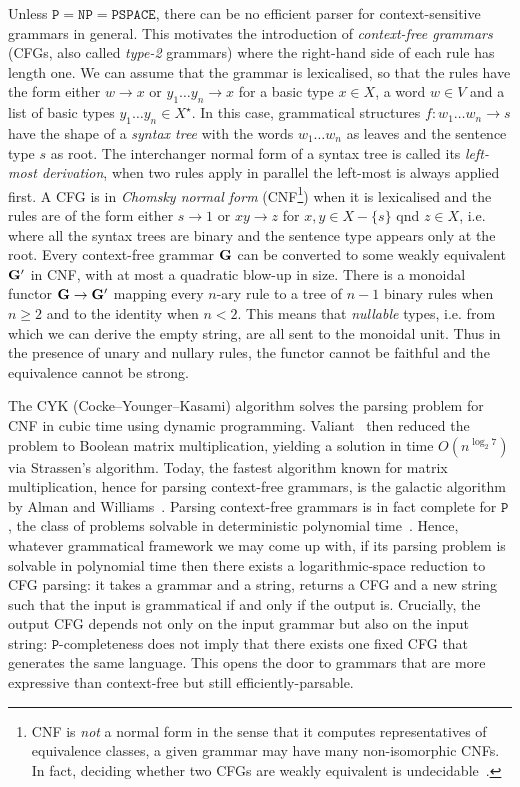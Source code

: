 Unless $\mathtt{P} = \mathtt{NP} = \mathtt{PSPACE}$, there can be no efficient parser for context-sensitive grammars in general.
This motivates the introduction of \emph{context-free grammars} (CFGs, also called \emph{type-2} grammars) where the right-hand side of each rule has length one.
We can assume that the grammar is lexicalised, so that the rules have the form either $w \to x$ or $y_1 \dots y_n \to x$ for a basic type $x \in X$, a word $w \in V$ and a list of basic types $y_1 \dots y_n \in X^\star$.
In this case, grammatical structures $f : w_1 \dots w_n \to s$ have the shape of a \emph{syntax tree} with the words $w_1 \dots w_n$ as leaves and the sentence type $s$ as root.
The interchanger normal form of a syntax tree is called its \emph{left-most derivation}, when two rules apply in parallel the left-most is always applied first.
A CFG is in \emph{Chomsky normal form} (CNF\footnote
{CNF is \emph{not} a normal form in the sense that it computes representatives of equivalence classes, a given grammar may have many non-isomorphic CNFs.
In fact, deciding whether two CFGs are weakly equivalent is undecidable~\cite[Theorem~26]{Chomsky63}.}) when it is lexicalised and the rules are of the form either $s \to 1$ or $x y \to z$ for $x, y \in X - \{ s \}$ qnd $z \in X$, i.e. where all the syntax trees are binary and the sentence type appears only at the root.
Every context-free grammar $\mathbf{G}$ can be converted to some weakly equivalent $\mathbf{G}'$ in CNF, with at most a quadratic blow-up in size.
There is a monoidal functor $\mathbf{G} \to \mathbf{G}'$ mapping every $n$-ary rule to a tree of $n - 1$ binary rules when $n \geq 2$ and to the identity when $n < 2$.
This means that \emph{nullable} types, i.e. from which we can derive the empty string, are all sent to the monoidal unit.
Thus in the presence of unary and nullary rules, the functor cannot be faithful and the equivalence cannot be strong.

The CYK (Cocke–Younger–Kasami) algorithm solves the parsing problem for CNF in cubic time using dynamic programming.
Valiant~\cite{Valiant75} then reduced the problem to Boolean matrix multiplication, yielding a solution in time $O(n^{\log_2 7})$ via Strassen's algorithm.
Today, the fastest algorithm known for matrix multiplication, hence for parsing context-free grammars, is the galactic algorithm by Alman and Williams~\cite{AlmanWilliams21}.
Parsing context-free grammars is in fact complete for $\mathtt{P}$, the class of problems solvable in deterministic polynomial time~\cite{JonesLaaser74}.
Hence, whatever grammatical framework we may come up with, if its parsing problem is solvable in polynomial time then there exists a logarithmic-space reduction to CFG parsing: it takes a grammar and a string, returns a CFG and a new string such that the input is grammatical if and only if the output is.
Crucially, the output CFG depends not only on the input grammar but also on the input string: $\mathtt{P}$-completeness does not imply that there exists one fixed CFG that generates the same language.
This opens the door to grammars that are more expressive than context-free but still efficiently-parsable.

